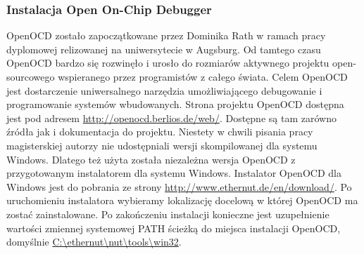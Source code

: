 \subsubsection{Instalacja Open On-Chip Debugger}
OpenOCD zostało zapoczątkowane przez Dominika Rath w ramach pracy dyplomowej
relizowanej na uniwersytecie w Augsburg. Od tamtego czasu OpenOCD bardzo się
rozwinęło i urosło do rozmiarów aktywnego projektu open-sourcowego wspieranego
przez programistów z całego świata. Celem OpenOCD jest dostarczenie
uniwersalnego narzędzia umożliwiającego debugowanie i programowanie systemów
wbudowanych. \newline \newline
Strona projektu OpenOCD dostępna jest pod adresem
\url{http://openocd.berlios.de/web/}. Dostępne są tam zarówno źródła jak i
dokumentacja do projektu. Niestety w chwili pisania pracy magisterskiej autorzy
nie udostępniali wersji skompilowanej dla systemu Windows. Dlatego też użyta
została niezależna wersja OpenOCD z przygotowanym instalatorem dla systemu
Windows. Instalator OpenOCD dla Windows jest do pobrania ze strony
\url{http://www.ethernut.de/en/download/}. Po uruchomieniu instalatora wybieramy
lokalizację docelową w której OpenOCD ma zostać zainstalowane. Po zakończeniu
instalacji konieczne jest uzupełnienie wartości zmiennej systemowej PATH ścieżką
do miejsca instalacji OpenOCD, domyślnie \url{C:\ethernut\nut\tools\win32}.

